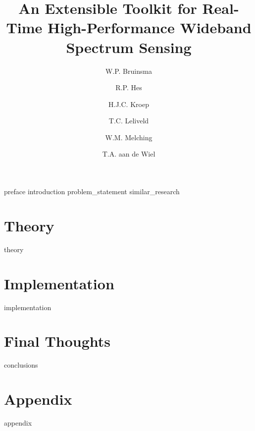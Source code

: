 \documentclass[a4paper, twoside]{memoir}
\title{An Extensible Toolkit for Real-Time High-Performance Wideband Spectrum Sensing}
\author{W.P. Bruinsma \and R.P. Hes \and H.J.C. Kroep \and T.C. Leliveld \and W.M. Melching \and T.A. aan de Wiel}
\begin{document}
\frontmatter

\begin{titlingpage}
  \pagestyle{empty}
  \titleGM
\end{titlingpage}

\tableofcontents

\mainmatter
{preface}
{introduction}
{problem_statement}
{similar_research}

\part{Theory}
\label{prt:theory}
{theory}

\part{Implementation}
\label{prt:implementation}
{implementation}


\partauthor{}
\part{Final Thoughts}
{conclusions}

\clearpage
\printbibliography

\clearpage
{}
\appendix

\partauthor{}
\part{Appendix}
{appendix}
\end{document}
